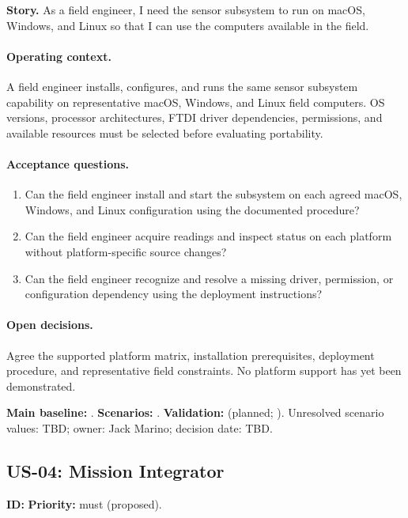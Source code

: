 \noindent\textbf{Story.} As a field engineer, I need the sensor subsystem to run on macOS, Windows, and Linux so that I can use the computers available in the field.

\paragraph{Operating context.} A field engineer installs, configures, and runs the same sensor subsystem capability on representative macOS, Windows, and Linux field computers. OS versions, processor architectures, FTDI driver dependencies, permissions, and available resources must be selected before evaluating portability.

\paragraph{Acceptance questions.}
\begin{enumerate}
\item Can the field engineer install and start the subsystem on each agreed macOS, Windows, and Linux configuration using the documented procedure?
\item Can the field engineer acquire readings and inspect status on each platform without platform-specific source changes?
\item Can the field engineer recognize and resolve a missing driver, permission, or configuration dependency using the deployment instructions?
\end{enumerate}
\paragraph{Open decisions.} Agree the supported platform matrix, installation prerequisites, deployment procedure, and representative field constraints. No platform support has yet been demonstrated.

\begingroup\raggedright
\noindent\textbf{Main baseline:} .
\noindent\textbf{Scenarios:} .
\noindent\textbf{Validation:}  (planned; \StatusPending). Unresolved scenario values: TBD; owner: Jack Marino; decision date: TBD.\par\endgroup

\subsection{US-04: Mission Integrator}
\noindent\textbf{ID:} \quad\textbf{Priority:} \gls{must} (proposed).

